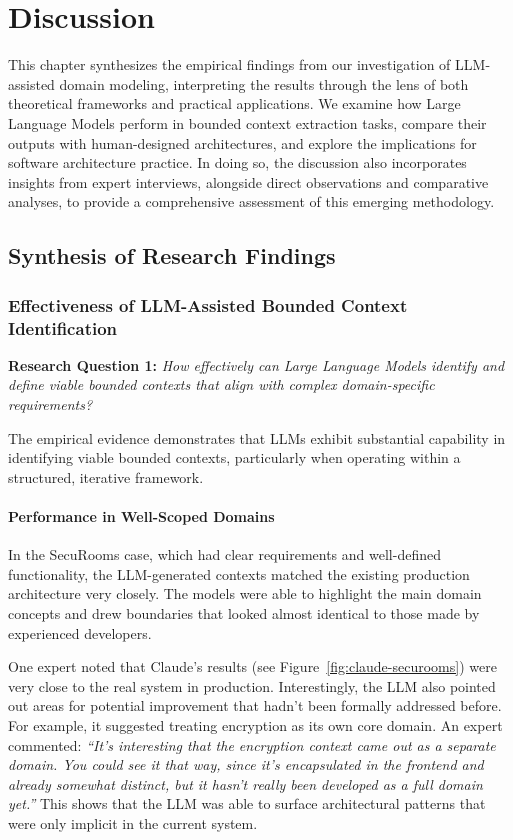 \chapter{Discussion}\label{chapter:discussion}

This chapter synthesizes the empirical findings from our investigation of LLM-assisted domain modeling, interpreting the results through the lens of both theoretical frameworks and practical applications. We examine how Large Language Models perform in bounded context extraction tasks, compare their outputs with human-designed architectures, and explore the implications for software architecture practice. In doing so, the discussion also incorporates insights from expert interviews, alongside direct observations and comparative analyses, to provide a comprehensive assessment of this emerging methodology.

\section{Synthesis of Research Findings}

\subsection{Effectiveness of LLM-Assisted Bounded Context Identification}

\textbf{Research Question 1:} \textit{How effectively can Large Language Models identify and define viable bounded contexts that align with complex domain-specific requirements?}

The empirical evidence demonstrates that LLMs exhibit substantial capability in identifying viable bounded contexts, particularly when operating within a structured, iterative framework.

\subsubsection{Performance in Well-Scoped Domains}
In the SecuRooms case, which had clear requirements and well-defined functionality, the LLM-generated contexts matched the existing production architecture very closely. The models were able to highlight the main domain concepts and drew boundaries that looked almost identical to those made by experienced developers.

One expert noted that Claude's results (see Figure~\ref{fig:claude-securooms}) were very close to the real system in production. Interestingly, the LLM also pointed out areas for potential improvement that hadn't been formally addressed before. For example, it suggested treating encryption as its own core domain. An expert commented: \textit{“It's interesting that the encryption context came out as a separate domain. You could see it that way, since it's encapsulated in the frontend and already somewhat distinct, but it hasn't really been developed as a full domain yet.”} This shows that the LLM was able to surface architectural patterns that were only implicit in the current system.

